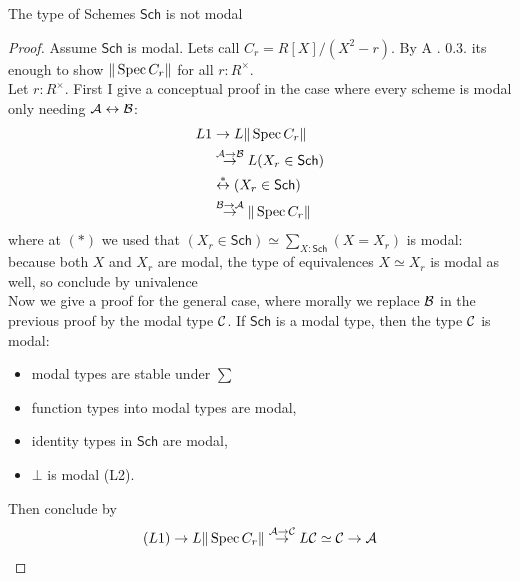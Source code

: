 \documentclass{article}
\newcommand{\Sch}{\mathsf{Sch}}
\begin{document}
\begin{corollary}
	The type of Schemes $\Sch$ is not modal
\end{corollary}
\begin{proof}
	Assume $\Sch$ is modal. Lets call $C_r = R[X] / (X^2 - r)$.  By \cite{cherubini2023foundationsyntheticalgebraicgeometry} A . 0.3. its enough to show $\|\operatorname{Spec} C_r\|$ for all $r : R^\times$. \\
	Let $r : R^\times$. %
%	
	First I give a conceptual proof in the case where every scheme is modal only needing $\mathcal{A} \leftrightarrow \mathcal{B}$:
	\begin{align*}
	L1 &\rightarrow L \| \Spec C_r\| \\
	&\overset{\cA \rightarrow \cB}{\rightarrow} L (X_r \in \Sch) \\
	& \overset{*}{\leftrightarrow} (X_r \in \Sch ) \\
	&\overset{\cB \rightarrow \cA}{\rightarrow} \|\Spec C_r\| \\
	\end{align*}
where at $(*)$ we used that $(X_r \in \Sch) \simeq \sum_{X: \Sch} (X = X_r)$ is modal: because both $X$ and $X_r$ are modal, the type of equivalences $X \simeq X_r$ is modal as well, so conclude by univalence \\
	
	Now we give a proof for the general case, where morally we replace $\mathcal{B}$ in the previous proof by the modal type $\mathcal{C}$. 
	If $\Sch$ is a modal type, then the type $\mathcal{C}$ is modal:
	\begin{itemize}
		\item modal types are stable under $\sum$
		\item function types into modal types are modal,
		\item identity types in $\Sch$ are modal, 
		\item $\bot$ is modal (L2).
	\end{itemize}
	Then conclude by
	\begin{align*}
		(L1) \to L \|\operatorname{Spec} C_r\| \overset{\mathcal{A} \to \mathcal{C}}{\to} L \mathcal{C} \simeq \mathcal{C} \to \mathcal{A}
	\end{align*}
\end{proof}
\end{document}
